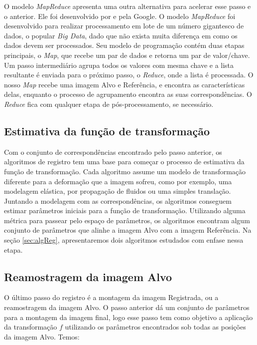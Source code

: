     O modelo \textit{MapReduce} apresenta uma outra alternativa para acelerar esse passo e o anterior. Ele foi
desenvolvido por \cite{dean2008mapreduce} e pela Google. O modelo \textit{MapReduce} foi desenvolvido para realizar
processamento em lote de um número gigantesco de dados, o popular \textit{Big Data}, dado que não exista muita diferença
em como os dados devem ser processados. Seu modelo de programação contém duas etapas principais, o \textit{Map}, que
recebe um par de dados e retorna um par de valor/chave. Um passo intermediário agrupa todos os valores com mesma chave e
a lista resultante é enviada para o próximo passo, o \textit{Reduce}, onde a lista é processada. O nosso \textit{Map}
recebe uma imagem Alvo e Referência, e encontra as características delas, enquanto o processo de agrupamento encontra as
suas correspondências. O \textit{Reduce} fica com qualquer etapa de pós-processamento, se necessário.

\subsection{Estimativa da função de transformação}

Com o conjunto de correspondências encontrado pelo passo anterior, os algoritmos de registro tem uma base para
começar o processo de estimativa da função de transformação. Cada algoritmo assume um modelo de transformação diferente
para a deformação que a imagem sofreu, como por exemplo, uma modelagem elástica, por propagação de fluidos ou uma
simples translação. Juntando a modelagem com as correspondências, os algoritmos conseguem estimar parâmetros iniciais
para a função de transformação. Utilizando alguma métrica para passear pelo espaço de parâmetros, os algoritmos encontram
algum conjunto de parâmetros que alinhe a imagem Alvo com a imagem Referência. Na seção \ref{sec:algReg}, apresentaremos
dois algoritmos estudados com enfase nessa etapa.

\subsection{Reamostragem da imagem Alvo}

O último passo do registro é a montagem da imagem Registrada, ou a reamostragem da imagem Alvo. O passo anterior
dá um conjunto de parâmetros para a montagem da imagem final, logo esse passo tem como objetivo a aplicação
da transformação $f$ utilizando os parâmetros encontrados sob todas as posições da imagem Alvo. Temos:

